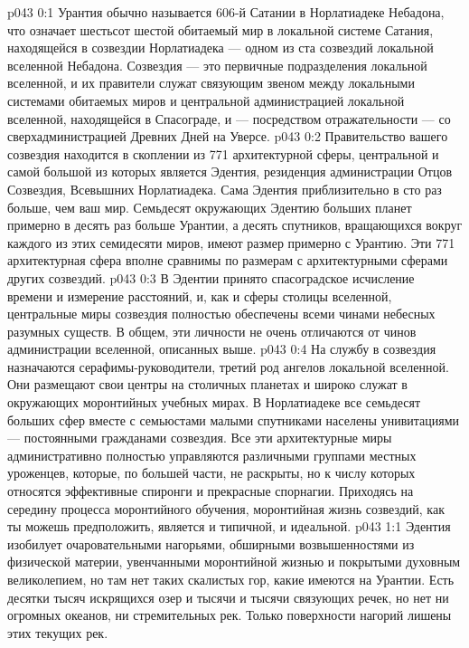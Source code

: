\author{Малаватия Мелхиседек}
\vs p043 0:1 Урантия обычно называется 606\hyp{}й Сатании в Норлатиадеке Небадона, что означает шестьсот шестой обитаемый мир в локальной системе Сатания, находящейся в созвездии Норлатиадека --- одном из ста созвездий локальной вселенной Небадона. Созвездия --- это первичные подразделения локальной вселенной, и их правители служат связующим звеном между локальными системами обитаемых миров и центральной администрацией локальной вселенной, находящейся в Спасограде, и --- посредством отражательности --- со сверхадминистрацией Древних Дней на Уверсе.
\vs p043 0:2 \pc Правительство вашего созвездия находится в скоплении из 771 архитектурной сферы, центральной и самой большой из которых является Эдентия, резиденция администрации Отцов Созвездия, Всевышних Норлатиадека. Сама Эдентия приблизительно в сто раз больше, чем ваш мир. Семьдесят окружающих Эдентию больших планет примерно в десять раз больше Урантии, а десять спутников, вращающихся вокруг каждого из этих семидесяти миров, имеют размер примерно с Урантию. Эти 771 архитектурная сфера вполне сравнимы по размерам с архитектурными сферами других созвездий.
\vs p043 0:3 \pc В Эдентии принято спасоградское исчисление времени и измерение расстояний, и, как и сферы столицы вселенной, центральные миры созвездия полностью обеспечены всеми чинами небесных разумных существ. В общем, эти личности не очень отличаются от чинов администрации вселенной, описанных выше.
\vs p043 0:4 На службу в созвездия назначаются серафимы\hyp{}руководители, третий род ангелов локальной вселенной. Они размещают свои центры на столичных планетах и широко служат в окружающих моронтийных учебных мирах. В Норлатиадеке все семьдесят больших сфер вместе с семьюстами малыми спутниками населены унивитациями --- постоянными гражданами созвездия. Все эти архитектурные миры административно полностью управляются различными группами местных уроженцев, которые, по большей части, не раскрыты, но к числу которых относятся эффективные спиронги и прекрасные спорнагии. Приходясь на середину процесса моронтийного обучения, моронтийная жизнь созвездий, как ты можешь предположить, является и типичной, и идеальной.
\vs p043 1:1 Эдентия изобилует очаровательными нагорьями, обширными возвышенностями из физической материи, увенчанными моронтийной жизнью и покрытыми духовным великолепием, но там нет таких скалистых гор, какие имеются на Урантии. Есть десятки тысяч искрящихся озер и тысячи и тысячи связующих речек, но нет ни огромных океанов, ни стремительных рек. Только поверхности нагорий лишены этих текущих рек.
